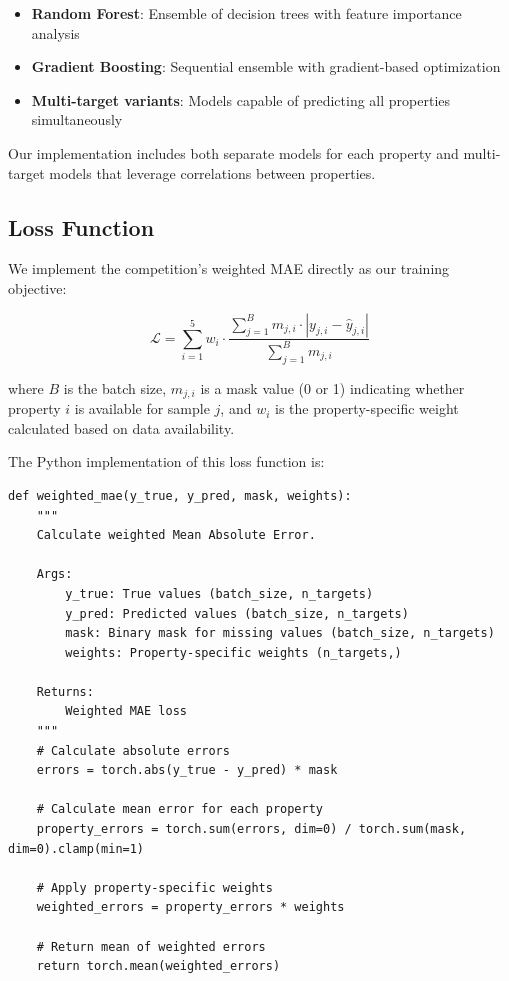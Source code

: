 \documentclass[10pt,twocolumn,letterpaper]{article}
\begin{document}
\begin{itemize}
    \item \textbf{Random Forest}: Ensemble of decision trees with feature importance analysis
    \item \textbf{Gradient Boosting}: Sequential ensemble with gradient-based optimization
    \item \textbf{Multi-target variants}: Models capable of predicting all properties simultaneously
\end{itemize}

Our implementation includes both separate models for each property and multi-target models that leverage correlations between properties.

\subsection{Loss Function}

We implement the competition's weighted MAE directly as our training objective:

\begin{equation}
\mathcal{L} = \sum_{i=1}^5 w_i \cdot \frac{\sum_{j=1}^B m_{j,i} \cdot |y_{j,i} - \hat{y}_{j,i}|}{\sum_{j=1}^B m_{j,i}}
\end{equation}

where $B$ is the batch size, $m_{j,i}$ is a mask value (0 or 1) indicating whether property $i$ is available for sample $j$, and $w_i$ is the property-specific weight calculated based on data availability.

The Python implementation of this loss function is:

\begin{lstlisting}
def weighted_mae(y_true, y_pred, mask, weights):
    """
    Calculate weighted Mean Absolute Error.
    
    Args:
        y_true: True values (batch_size, n_targets)
        y_pred: Predicted values (batch_size, n_targets)
        mask: Binary mask for missing values (batch_size, n_targets)
        weights: Property-specific weights (n_targets,)
        
    Returns:
        Weighted MAE loss
    """
    # Calculate absolute errors
    errors = torch.abs(y_true - y_pred) * mask
    
    # Calculate mean error for each property
    property_errors = torch.sum(errors, dim=0) / torch.sum(mask, dim=0).clamp(min=1)
    
    # Apply property-specific weights
    weighted_errors = property_errors * weights
    
    # Return mean of weighted errors
    return torch.mean(weighted_errors)
\end{lstlisting}
\end{document}
